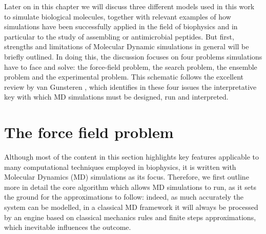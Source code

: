 Later on in this chapter we will discuss three different models used in this work to simulate biological molecules, together with relevant examples of how simulations have been successfully applied in the field of biophysics and in particular to the study of assembling or antimicrobial peptides.
%
But first, strengths and limitations of Molecular Dynamic simulations in general will be briefly outlined. In doing this, the discussion focuses on four problems simulations have to face and solve: the force-field problem, the search problem, the ensemble problem and the experimental problem. This schematic follows the excellent review by van Gunsteren \cite{vanGunsteren2006}, which identifies in these four issues the interpretative key with which MD simulations must be designed, run and interpreted.


\section{The force field problem}


Although most of the content in this section highlights key features applicable to many computational techniques employed in biophysics, it is written with Molecular Dynamics (MD) simulations as its focus. Therefore, we first outline more in detail the core algorithm which allows MD simulations to run, as it sets the ground for the approximations to follow: indeed, as much accurately the system can be modelled, in a classical MD framework it will always be processed by an engine based on classical mechanics rules and finite steps approximations, which inevitable influences the outcome.

